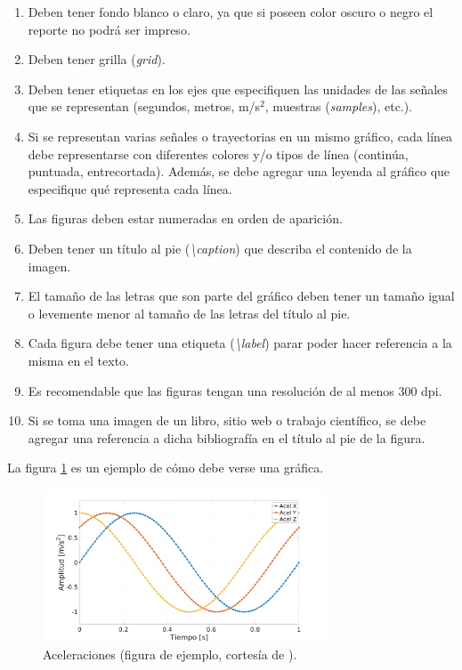 \documentclass{article}
\begin{document}
\begin{enumerate}

    \item Deben tener fondo blanco o claro, ya que si poseen color oscuro o negro el reporte no podrá ser impreso.
    
    \item Deben tener grilla (\emph {grid}).
    
    \item Deben tener etiquetas en los ejes que especifiquen las unidades de las señales que se representan (segundos, metros, m/s$^2$, muestras (\emph{samples}), etc.).
    
    \item Si se representan varias señales o trayectorias en un mismo gráfico, cada línea debe representarse con diferentes colores y/o tipos de línea (continúa, puntuada, entrecortada). Además, se debe agregar una leyenda al gráfico que especifique qué representa cada línea.
    
    \item Las figuras deben estar numeradas en orden de aparición.
    
    \item Deben tener un título al pie (\emph{\textbackslash caption}) que describa el contenido de la imagen.
    
    \item El tamaño de las letras que son parte del gráfico deben tener un tamaño igual o levemente menor al tamaño de las letras del título al pie.
    
    \item Cada figura debe tener una etiqueta (\emph{\textbackslash label}) parar poder hacer referencia a la misma en el texto.
    
    \item Es recomendable que las figuras tengan una resolución de al menos 300 dpi.
    
    \item Si se toma una imagen de un libro, sitio web o trabajo científico, se debe agregar una referencia a dicha bibliografía en el título al pie de la figura.
    
\end{enumerate}

La figura \ref{fig:aceleraciones} es un ejemplo de cómo debe verse una gráfica.

\begin{figure}[H]
    \centering
    \includegraphics[width=0.75\textwidth]{aceleraciones}
    \caption{Aceleraciones (figura de ejemplo, cortesía de \cite{Gonzalez2019}).}
    \label{fig:aceleraciones}
\end{figure}
\end{document}
